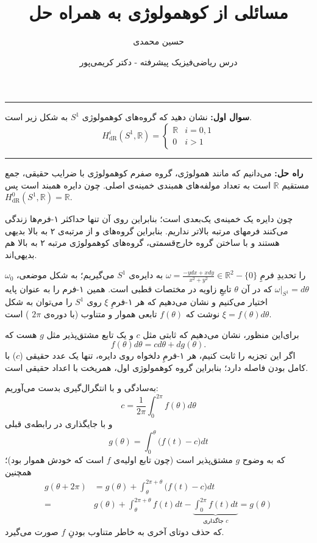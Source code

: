 \documentclass[a4paper, 12pt]{article}
\title{\textbf{
  مسائلی از کوهمولوژی 
  \lr{De Rham} به همراه حل
}}
\author{حسین محمدی
}
\date{درس ریاضی‌فیزیک پیشرفته - دکتر کریمی‌پور}
\begin{document}
\maketitle

\par\noindent\rule{\textwidth}{2pt}

\vspace{0.5em}
\noindent
\textbf{سوال اول:}
نشان دهید که گروه‌های کوهمولوژی 
$S^1$‌
به شکل زیر است.
\[
H_{\text{dR}}^i(S^1,\mathbb{R}) = 
\begin{cases}
	\mathbb{R} & i=0,1 \\ 
	0 & i>1
\end{cases}
\]
\par\noindent\rule{\textwidth}{0.6pt}
\textbf{راه حل:}
می‌دانیم که مانند همولوژی، گروه صفرم کوهمولوژی با ضرایب حقیقی، جمع مستقیم $\mathbb{R}$ است به تعداد مولفه‌های همبندی خمینه‌ی اصلی. چون دایره همبند است پس 
$H_{\text{dR}}^0(S^1,\mathbb{R}) = \mathbb{R}$.

چون دایره یک خمینه‌ی یک‌بعدی است؛ بنابراین روی آن تنها حداکثر ۱-فرم‌ها زندگی می‌کنند فرمهای مرتبه بالاتر نداریم. بنابراین گروه‌های 
و 
از مرتبه‌ی ۲ به بالا بدیهی هستند و با ساختن گروه خارج‌قسمتی، گروه‌های کوهمولوژی مرتبه ۲ به بالا هم بدیهی‌اند.

$\omega_0$
را تحدیدِ فرمِ
$\omega  = \frac{-ydx+xdy}{x^2+y^2} \in \mathbb{R}^2- \{0\}$
به دایره‌ی $S^1$
می‌گیریم؛ به شکل موضعی، 
$\omega\big|_{S^1} =d\theta$
که در آن $\theta$ تابعِ زاویه در مختصات قطبی است. همین ۱-فرم‌ را به عنوان پایه اختیار می‌کنیم و نشان می‌دهیم که هر ۱-فرمِ $\xi$ روی $S^1$ را می‌توان به شکل 
$\xi = f(\theta) d\theta$
نوشت که 
$f(\theta)$
تابعی هموار و متناوب (با دوره‌ی 
$2\pi$
)
است.

برای‌این منظور، نشان‌ می‌دهیم که ثابتی مثل $c$ و یک تابع مشتق‌پذیر مثل $g$ هست که 
\[f(\theta) d\theta = cd\theta + dg(\theta).\]
 اگر این تجزیه را ثابت کنیم، هر ۱-فرمِ دلخواه روی دایره، تنها یک عدد حقیقی 
($c$)
با کامل بودن فاصله دارد؛ بنابراین گروه کوهمولوژی اول، همریخت با اعداد حقیقی است.

به‌سادگی و با انتگرال‌گیری بدست می‌آوریم:
\[
c = \frac{1}{2\pi} \int_0^{2\pi} f(\theta) d\theta 
\]
و با جایگذاری در رابطه‌ی قبلی
\[
g(\theta) = \int_0^\theta \big(
f(t) - c
\big) dt
\]
که به وضوح $g$ مشتق‌پذیر است (چون تابع‌ اولیه‌ی $f$ است که خودش هموار بود)؛ همچنین 
\begin{equation*}
	\begin{aligned}
		g(\theta + 2\pi) &= g(\theta) + \int_{\theta}^{2\pi + \theta} \big(f(t)-c\big) dt \\  =&g(\theta) + \int_{\theta}^{2\pi + \theta} f(t) dt - \underbrace{\int_{0}^{2\pi } f(t) dt}_{\text{جاگذاری $c$}} =g(\theta)
	\end{aligned}
\end{equation*}
که حذف دوتای آخری به خاطر متناوب بودنِ $f$ صورت می‌گیرد.
\end{document}
